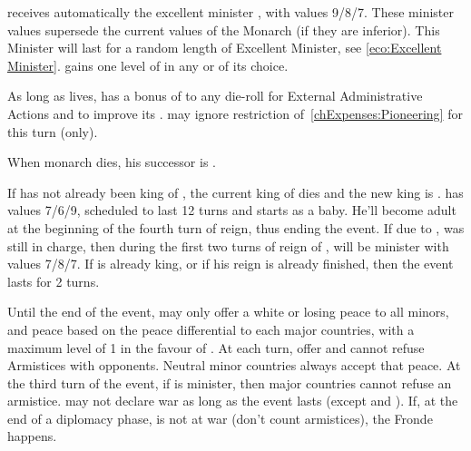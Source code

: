 \phevnt
\aparag \FRA receives automatically the excellent minister
, with values 9/8/7.  These minister values supersede the
current values of the Monarch (if they are inferior). This Minister will last
for a random length of Excellent Minister, see \ref{eco:Excellent Minister}.
\aparag \FRA gains one level of \TradeFLEET in any \CTZ or \STZ of its choice.

\phadm
\aparag As long as  lives, \FRA has a bonus of 
to any die-roll for External Administrative Actions and to improve its \FTI.
\aparag \FRA may ignore restriction of~\ref{chExpenses:Pioneering} for this
turn (only).

\phinter
\aparag When \FRA monarch dies, his successor is .





\phevnt
\aparag If  has not already been king of \FRA, the current
king of \FRA dies and the new king is .
\bparag {} has values 7/6/9, scheduled to last 12 turns and
starts as a baby.
\bparag He'll become adult at the beginning of the fourth turn of reign, thus
ending the event.
\aparag If due to ,  was still in
charge, then during the first two turns of reign of ,
 will be minister with values 7/8/7.
\aparag If  is already king, or if his reign is already
finished, then the event lasts for 2 turns.

\phdipl
\aparag Until the end of the event, \FRA may only offer a white or losing
peace to all minors, and peace based on the peace differential to each major
countries, with a maximum level of 1 in the favour of \FRA.
\bparag At each turn, \FRA offer and cannot refuse Armistices with opponents.
\bparag Neutral minor countries always accept that peace.
\bparag At the third turn of the event, if  is minister,
then major countries cannot refuse an armistice.
\aparag \FRA may not declare war as long as the event lasts (except
 and ).
\aparag If, at the end of a diplomacy phase, \FRA is not at war (don't count
armistices), the Fronde happens.

